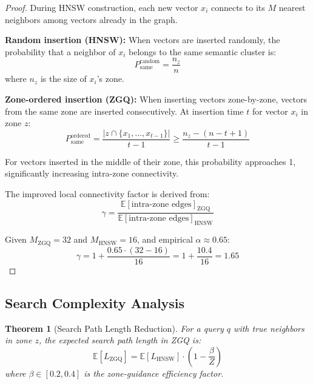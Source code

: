 \documentclass[11pt,a4paper]{article}
\newtheorem{theorem}{Theorem}[section]
\newcommand{\zgq}{\text{ZGQ}}
\newcommand{\hnsw}{\text{HNSW}}
\begin{document}
\begin{proof}
During HNSW construction, each new vector $x_i$ connects to its $M$ nearest neighbors among vectors already in the graph. 

\textbf{Random insertion (HNSW):} When vectors are inserted randomly, the probability that a neighbor of $x_i$ belongs to the same semantic cluster is:
\[
P_{\text{same}}^{\text{random}} = \frac{n_z}{n}
\]
where $n_z$ is the size of $x_i$'s zone.

\textbf{Zone-ordered insertion (ZGQ):} When inserting vectors zone-by-zone, vectors from the same zone are inserted consecutively. At insertion time $t$ for vector $x_i$ in zone $z$:
\[
P_{\text{same}}^{\text{ordered}} = \frac{|z \cap \{x_1, \ldots, x_{t-1}\}|}{t-1} \geq \frac{n_z - (n - t + 1)}{t - 1}
\]

For vectors inserted in the middle of their zone, this probability approaches 1, significantly increasing intra-zone connectivity.

The improved local connectivity factor is derived from:
\[
\gamma = \frac{\mathbb{E}[\text{intra-zone edges}]_{\zgq}}{\mathbb{E}[\text{intra-zone edges}]_{\hnsw}}
\]

Given $M_{\zgq} = 32$ and $M_{\hnsw} = 16$, and empirical $\alpha \approx 0.65$:
\[
\gamma = 1 + \frac{0.65 \cdot (32 - 16)}{16} = 1 + \frac{10.4}{16} = 1.65
\]
\end{proof}

\subsection{Search Complexity Analysis}

\begin{theorem}[Search Path Length Reduction]
\label{thm:path-length}
For a query $q$ with true neighbors in zone $z$, the expected search path length in ZGQ is:
\[
\mathbb{E}[L_{\zgq}] = \mathbb{E}[L_{\hnsw}] \cdot \left(1 - \frac{\beta}{Z}\right)
\]
where $\beta \in [0.2, 0.4]$ is the zone-guidance efficiency factor.
\end{theorem}
\end{document}
